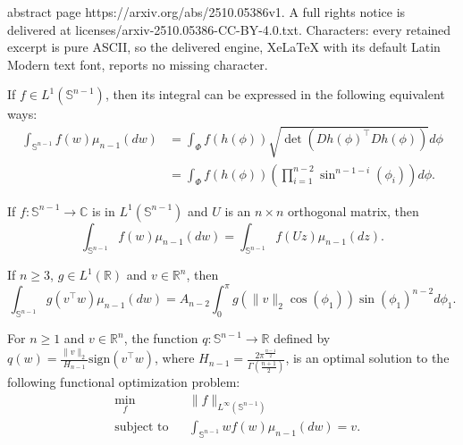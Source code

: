\documentclass[10pt,a4paper]{amsart}
\newcommand{\C}{\mathbb{C}}
\newcommand{\R}{\mathbb{R}}
\newcommand{\sign}{\mathrm{sign}}
\renewcommand{\S}{\mathbb{S}}
\begin{document}
abstract page https://arxiv.org/abs/2510.05386v1. A full rights notice is delivered at licenses/arxiv-2510.05386-CC-BY-4.0.txt. Characters: every retained excerpt is pure ASCII, so the delivered engine, XeLaTeX with its default Latin Modern text font, reports no missing character.
\begin{lemma}
\label{lem:coordinateIntegral}
If $f\in L^1(\S^{n-1})$, then its integral can be expressed in the following equivalent ways:
\begin{align*}
\int_{\S^{n-1}}f(w)\mu_{n-1}(dw)&=\int_{\Phi}
f(h(\phi))\sqrt{\det(Dh(\phi)^\top Dh(\phi))}d\phi \\
&=\int_{\Phi}f(h(\phi))\left(\prod_{i=1}^{n-2}\sin^{n-1
-i}(\phi_i)\right)d\phi.
\end{align*}
\end{lemma}

\begin{lemma}
\label{lem:rotationalInvariance}
If $f:\S^{n-1}\to \C$ is in $L^1(\S^{n-1})$ and $U$ is an $n\times n$ orthogonal matrix, then
$$
\int_{\S^{n-1}}f(w)\mu_{n-1}(dw)=\int_{\S^{n-1}}f(Uz)\mu_{n-1}(dz).
$$
\end{lemma}

\begin{lemma}
\label{eq:1dIntegral}
If $n\ge 3$,  $g\in L^1(\R)$ and $v\in \R^n$, then
$$
\int_{\S^{n-1}}g(v^\top w)\mu_{n-1}(dw)=A_{n-2}\int_0^\pi g(\|v\|_2 \cos(\phi_1))\sin(\phi_1)^{n-2}d\phi_1.
$$
\end{lemma}

\begin{lemma}
\label{lem:optLinear}
For $n\ge 1$ and $v\in \R^n$,
the function $q:\S^{n-1}\to \R$ defined by $q(w)=\frac{\|v\|_2}{H_{n-1}}\sign(v^\top w)$, where $H_{n-1}=\frac{2\pi^{\frac{n-1}{2}}}{\Gamma\left(\frac{n+1}{2}\right)}$, is an optimal solution to the following functional optimization problem:
\begin{align*}
&\min_f && \|f\|_{L^{\infty}(\S^{n-1})}\\
&\textrm{subject to} && \int_{\S^{n-1}}w f(w)\mu_{n-1}(dw)=v.
\end{align*}
\end{lemma}
\end{document}
